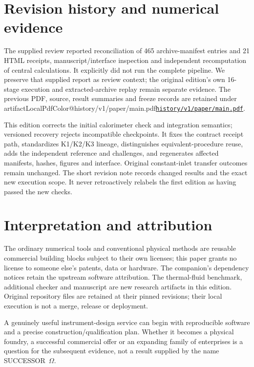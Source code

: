 \documentclass[11pt,letterpaper]{article}
\makeatletter
\newcommand{\OmegaS}{SUCCESSOR~$\Omega$}
\newcommand{\artifact}[1]{\begingroup\ifcsname artifactLocalPdfColor@#1\endcsname\hypersetup{urlcolor=cyan}\fi\href{\csname artifacturl@#1\endcsname}{\nolinkurl{#1}}\endgroup}
\makeatother
\begin{document}


\section{Revision history and numerical evidence}
\label{app:revision}
The supplied review reported reconciliation of 465 archive-manifest entries and 21 HTML receipts, manuscript/interface inspection and independent recomputation of central calculations. It explicitly did not run the complete pipeline. We preserve that supplied report as review context; the original edition's own 16-stage execution and extracted-archive replay remain separate evidence. The previous PDF, source, result summaries and freeze records are retained under \artifact{history/v1/paper/main.pdf}.

This edition corrects the initial calorimeter check and integration semantics; versioned recovery rejects incompatible checkpoints. It fixes the contract receipt path, standardizes K1/K2/K3 lineage, distinguishes equivalent-procedure reuse, adds the independent reference and challenges, and regenerates affected manifests, hashes, figures and interface. Original constant-inlet transfer outcomes remain unchanged. The short revision note records changed results and the exact new execution scope. It never retroactively relabels the first edition as having passed the new checks.



\section{Interpretation and attribution}
The ordinary numerical tools and conventional physical methods are reusable commercial building blocks subject to their own licenses; this paper grants no license to someone else's patents, data or hardware. The companion's dependency notices retain the upstream software attribution. The thermal-fluid benchmark, additional checker and manuscript are new research artifacts in this edition. Original repository files are retained at their pinned revisions; their local execution is not a merge, release or deployment.

A genuinely useful instrument-design service can begin with reproducible software and a precise construction/qualification plan. Whether it becomes a physical foundry, a successful commercial offer or an expanding family of enterprises is a question for the subsequent evidence, not a result supplied by the name \OmegaS.



\end{document}
